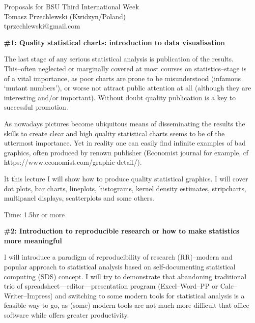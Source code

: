 \documentclass[a4page]{article}
\newcommand{\proposal}[1]{\bigskip\textbf{#1}\par\smallskip}
\begin{document}
\begin{center}
  \large
  Proposals for BSU Third International Week\\
  Tomasz Przechlewski (Kwidzyn/Poland)\\
  tprzechlewski@gmail.com
\end{center}

\vskip3mm
  
\proposal{\#1: Quality statistical charts: introduction to data visualisation}

     The last stage of any serious statistical analysis is publication
     of the results.  This--often neglected or marginally covered at
     most courses on statistics--stage is of a vital importance, as
     poor charts are prone to be misunderstood (infamous `mutant
     numbers'), or worse not attract public attention at all (although
     they are interesting and/or important).  Without doubt quality
     publication is a key to successful promotion.

     As nowadays pictures become ubiquitous means of disseminating the
     results the skills to create clear and high quality statistical
     charts seems to be of the uttermost importance. Yet in reality one can easily
     find infinite examples of bad graphics, often produced by renown
     publisher (Economist journal for example, cf https://www.economist.com/graphic-detail/).

     It this lecture I will show how to produce quality statistical graphics. I will cover
     dot plots, bar charts, lineplots, histograms, kernel density estimates, stripcharts,
     multipanel displays, scatterplots and some others.

     Time: 1.5hr or more

\proposal{\#2: Introduction to reproducible research or how to make statistics more meaningful }
 
     I will introduce a paradigm of reproducibility of research
     (RR)--modern and popular approach to statistical analysis based
     on self-documenting statistical computing (SDS) concept. I will
     try to demonstrate that abandoning traditional trio of
     spreadsheet---editor---presentation program (Excel--Word--PP or Calc--Writer--Impress)
     and switching to
     some modern tools for statistical analysis is a feasible way to
     go, as (some) modern tools are not much more
     difficult that office software while offers greater productivity.
\end{document}
